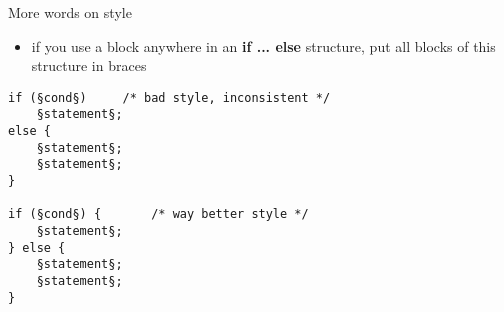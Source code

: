 \begin{frame}[fragile]{More words on style}
	\begin{itemize}
		\item if you use a block anywhere in an \textbf{if ... else} structure, put all blocks of this structure in braces
	\end{itemize}
	\begin{lstlisting}[numbers=none]
if (§cond§)		/* bad style, inconsistent */
	§statement§;
else {
	§statement§;
	§statement§;
}

if (§cond§) {		/* way better style */
	§statement§;
} else {
	§statement§;
	§statement§;
}
\end{lstlisting}
\end{frame}


